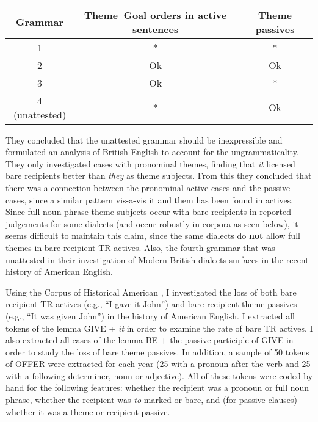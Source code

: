 \begin{exe}
\ex \cite[Table 2]{Haddican.2012}\\
 \begin{tabular}{|c|c|c|}
 \hline
 Grammar & Theme--Goal orders in active sentences & Theme passives\\
 \hline
 1 & * & * \\
 \hline
 2 & Ok & Ok \\
 \hline
 3 & Ok & * \\
 \hline
 4 (unattested) & * & Ok \\
 \hline
 \end{tabular}
\end{exe}%

They concluded that the unattested grammar should be inexpressible and formulated an analysis of British English to account for the ungrammaticality. They only investigated cases with pronominal themes, finding that \textit{it} licensed bare recipients better than \textit{they} as theme subjects. From this they concluded that there was a connection between the pronominal active cases and the passive cases, since a similar pattern vis-a-vis it and them has been found in actives. Since full noun phrase theme subjects occur with bare recipients in reported judgements for some dialects (and occur robustly in corpora as seen below), it seems difficult to maintain this claim, since the same dialects do \textbf{not} allow full themes in bare recipient TR actives. Also, the fourth grammar that was unattested in their investigation of Modern British dialects surfaces in the recent history of American English.

Using the Corpus of Historical American \citep{Davies.2010}, I investigated the loss of both bare recipient TR actives (e.g., ``I gave it John'') and bare recipient theme passives (e.g., ``It was given John'') in the history of American English. I extracted all tokens of the lemma GIVE + \textit{it} in order to examine the rate of bare TR actives. I also extracted all cases of the lemma BE + the passive participle of GIVE in order to study the loss of bare theme passives. In addition, a sample of 50 tokens of OFFER were extracted for each year (25 with a pronoun after the verb and 25 with a following determiner, noun or adjective). All of these tokens were coded by hand for the following features: whether the recipient was a pronoun or full noun phrase, whether the recipient was \textit{to}-marked or bare, and (for passive clauses) whether it was a theme or recipient passive.

